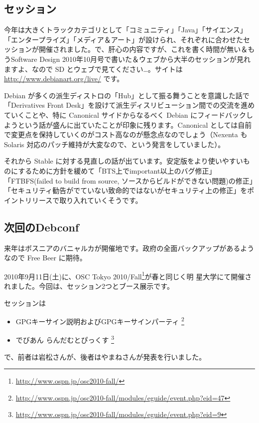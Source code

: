 \documentclass[mingoth,a4paper]{jsarticle}
\begin{document}
\subsection{セッション}

今年は大きくトラックカテゴリとして「コミュニティ」「Java」「サイエンス」「エンタープライズ」「メディア＆アート」が設けられ、それぞれに合わせたセッションが開催されました。で、肝心の内容ですが、これを書く時間が無い＆もうSoftware Design 2010年10月号で書いた＆ウェブから大半のセッションが見れますよ、なので SD とウェブで見てください…。サイトは \url{http://www.debianart.org/live/} です。

Debian が多くの派生ディストロの「Hub」として振る舞うことを意識した話で「Derivatives Front Desk」を設けて派生ディスリビューション間での交流を進めていくことや、特に Canonical サイドからなるべく Debian にフィードバックしようという話が盛んに出ていたことが印象に残ります。Canonical としては自前で変更点を保持していくのがコスト高なのが懸念点なのでしょう（Nexenta も Solaris 対応のパッチ維持が大変なので、という発言をしていました）。

それから Stable に対する見直しの話が出ています。安定版をより使いやすいものにするために方針を緩めて「BTS上でimportant以上のバグ修正」「FTBFS(failed to build from source, ソースからビルドができない問題)の修正」「セキュリティ勧告がでていない致命的ではないがセキュリティ上の修正」をポイントリリースで取り入れていくそうです。

\subsection{次回のDebconf}
来年はボスニアのバニャルカが開催地です。政府の全面バックアップがあるようなので Free Beer に期待。


2010年9月11日(土)に、OSC Tokyo
2010/Fall\footnote{\url{http://www.ospn.jp/osc2010-fall/}}が春と同じく明
星大学にて開催されました。今回は、セッション2つとブース展示です。

セッションは
\begin{itemize}
 \item GPGキーサイン説明およびGPGキーサインパーティ
       \footnote{\url{http://www.ospn.jp/osc2010-fall/modules/eguide/event.php?eid=47}}
 \item でびあん らんだむとぴっくす
       \footnote{\url{http://www.ospn.jp/osc2010-fall/modules/eguide/event.php?eid=9}}
\end{itemize}
で、前者は岩松さんが、後者はやまねさんが発表を行いました。
\end{document}
